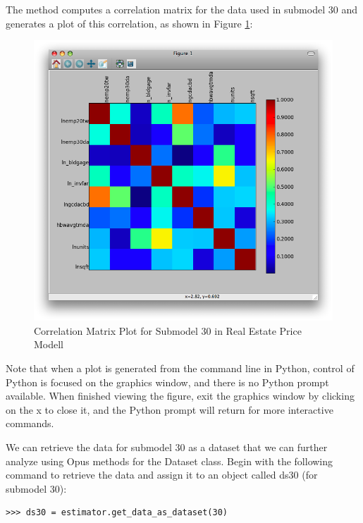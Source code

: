 The method computes a correlation matrix for the data used
in submodel 30 and generates a plot of this correlation, as
shown in Figure \ref{fig:correlation30}:

\begin{figure}[htp]
\begin{center}
\includegraphics[scale=0.35]{graphics/correlation30.png}
\end{center}
\caption{Correlation Matrix Plot for Submodel 30 in Real Estate Price Modell}
\label{fig:correlation30}
\end{figure}

Note that when a plot is generated from the command line in
Python, control of Python is focused on the graphics window,
and there is no Python prompt available.  When finished
viewing the figure, exit the graphics window by clicking on
the x to close it, and the Python prompt will return for
more interactive commands.

We can retrieve the data for submodel 30 as a dataset that
we can further analyze using Opus methods for the Dataset
class.  Begin with the following command to retrieve the
data and assign it to an object called ds30 (for submodel
30):

\begin{verbatim}
>>> ds30 = estimator.get_data_as_dataset(30)
\end{verbatim}

